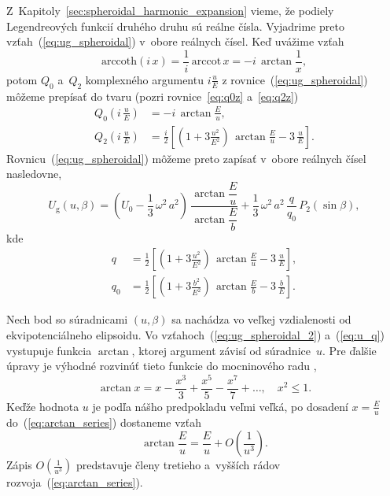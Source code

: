 \documentclass[a4paper, 12pt]{book}
\newcommand{\gidx}{\mathrm g}
\begin{document}
Z~Kapitoly~\ref{sec:spheroidal_harmonic_expansion} vieme, že podiely 
Legendreových funkcií druhého druhu sú reálne čísla.  Vyjadrime preto 
vzťah~(\ref{eq:ug_spheroidal}) v~obore reálnych čísel.  Keď uvážime vzťah 
\parencite{Moritz1967}
%
\begin{equation}
\mathrm{arccoth} (i \, x) = \frac{1}{i} \, \mathrm{arccot} \, x = -i \, 
\arctan\frac{1}{x}{,}
\end{equation}
%
potom $Q_0$ a~$Q_2$ komplexného argumentu $i \frac{u}{E}$ 
z rovnice~(\ref{eq:ug_spheroidal}) môžeme prepísať do tvaru (pozri 
rovnice~\ref{eq:q0z} a~\ref{eq:q2z})
%
\begin{align}
Q_0\left( i \, \frac{u}{E} \right) &= -i \, \arctan\frac{E}{u}{,}\\
%
Q_2\left( i \, \frac{u}{E} \right) &= \frac{i}{2} \left[ \left( 
1 + 3 \frac{u^2}{E^2} \right) \, \arctan\frac{E}{u} - 3 \, \frac{u}{E} 
\right]{.}
\end{align}
%
Rovnicu~(\ref{eq:ug_spheroidal}) môžeme preto zapísať v~obore reálnych čísel 
nasledovne,
%
\begin{equation}
\label{eq:ug_spheroidal_2}
U_\gidx(u, \beta) = \left( U_0 - \frac{1}{3} \, \omega^2 \, a^2 \right) \, 
\frac{\arctan\dfrac{E}{u}}{\arctan\dfrac{E}{b}} + \frac{1}{3} \, \omega^2 \, 
a^2 \, \frac{q}{q_0} \, P_2(\sin\beta){,}
\end{equation}
%
kde
%
\begin{align}
\label{eq:u_q}
q &= \frac{1}{2} \left[ \left( 1 + 3 \frac{u^2}{E^2} \right) \, 
\arctan\frac{E}{u} - 3 \, \frac{u}{E} \right]{,}\\
%
q_0 &= \frac{1}{2} \left[ \left( 1 + 3 \frac{b^2}{E^2} \right) \, 
\arctan\frac{E}{b} - 3 \, \frac{b}{E} \right]{.}
\end{align}

Nech bod so súradnicami $(u, \beta)$ sa nachádza vo veľkej vzdialenosti od 
ekvipotenciálneho elipsoidu.  Vo vzťahoch~(\ref{eq:ug_spheroidal_2}) 
a~(\ref{eq:u_q}) vystupuje funkcia $\arctan$, ktorej argument závisí od 
súradnice~$u$.  Pre ďalšie úpravy je výhodné rozvinúť tieto funkcie do 
mocninového radu \parencite{Gradshteyn2007},
%
\begin{equation}
\label{eq:arctan_series}
\arctan x = x - \frac{x^3}{3} + \frac{x^5}{5} - \frac{x^7}{7} + \dots{,} \quad 
x^2 \leq 1{.}
\end{equation}
%
Keďže hodnota $u$ je podľa nášho predpokladu veľmi veľká, po dosadení $x 
= \frac{E}{u}$ do~(\ref{eq:arctan_series}) dostaneme vzťah
%
\begin{equation}
\label{eq:eu_atan}
\arctan\frac{E}{u} = \frac{E}{u} + O\left( \frac{1}{u^3} \right){.}
\end{equation}
%
Zápis $O\left( \frac{1}{u^3} \right)$ predstavuje členy tretieho a~vyšších 
rádov rozvoja~(\ref{eq:arctan_series}).
\end{document}
